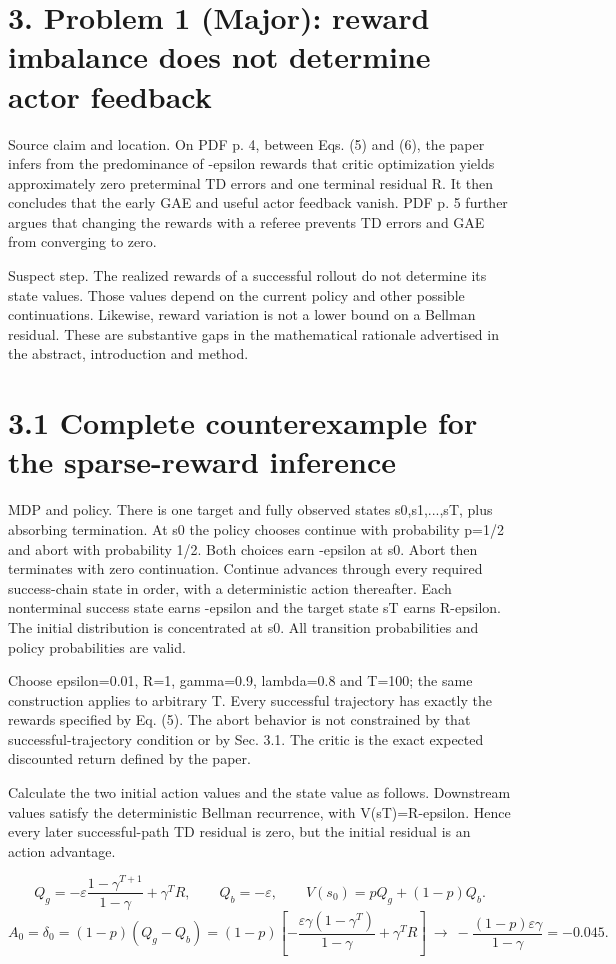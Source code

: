 \documentclass[10pt]{article}
\begin{document}
\section*{3. Problem 1 (Major): reward imbalance does not determine actor feedback}
Source claim and location. On PDF p. 4, between Eqs. (5) and (6), the paper infers from the predominance of -epsilon rewards that critic optimization yields approximately zero preterminal TD errors and one terminal residual R. It then concludes that the early GAE and useful actor feedback vanish. PDF p. 5 further argues that changing the rewards with a referee prevents TD errors and GAE from converging to zero.\par
Suspect step. The realized rewards of a successful rollout do not determine its state values. Those values depend on the current policy and other possible continuations. Likewise, reward variation is not a lower bound on a Bellman residual. These are substantive gaps in the mathematical rationale advertised in the abstract, introduction and method.\par
\section*{3.1 Complete counterexample for the sparse-reward inference}
MDP and policy. There is one target and fully observed states s0,s1,...,sT, plus absorbing termination. At s0 the policy chooses continue with probability p=1/2 and abort with probability 1/2. Both choices earn -epsilon at s0. Abort then terminates with zero continuation. Continue advances through every required success-chain state in order, with a deterministic action thereafter. Each nonterminal success state earns -epsilon and the target state sT earns R-epsilon. The initial distribution is concentrated at s0. All transition probabilities and policy probabilities are valid.\par
Choose epsilon=0.01, R=1, gamma=0.9, lambda=0.8 and T=100; the same construction applies to arbitrary T. Every successful trajectory has exactly the rewards specified by Eq. (5). The abort behavior is not constrained by that successful-trajectory condition or by Sec. 3.1. The critic is the exact expected discounted return defined by the paper.\par
Calculate the two initial action values and the state value as follows. Downstream values satisfy the deterministic Bellman recurrence, with V(sT)=R-epsilon. Hence every later successful-path TD residual is zero, but the initial residual is an action advantage.\par
\[Q_g=-\varepsilon\frac{1-\gamma^{T+1}}{1-\gamma}+\gamma^T R,\qquad Q_b=-\varepsilon,\qquad V(s_0)=pQ_g+(1-p)Q_b.\] \[A_0=\delta_0=(1-p)(Q_g-Q_b)=(1-p)\left[-\frac{\varepsilon\gamma(1-\gamma^T)}{1-\gamma}+\gamma^T R\right]\ \longrightarrow\ -\frac{(1-p)\varepsilon\gamma}{1-\gamma}=-0.045.\]\par
\end{document}
